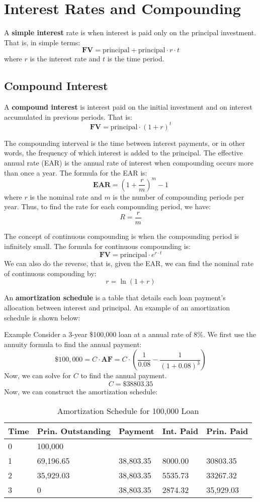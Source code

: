 \section{Interest Rates and Compounding}
A \textbf{simple interest} rate is when interest is paid only on the principal investment. That is, in simple terms:
$$
\textbf{FV} = \text{principal} + \text{principal} \cdot r \cdot t
$$
where $r$ is the interest rate and $t$ is the time period.

\subsection{Compound Interest}
A \textbf{compound interest} is interest paid on the initial investment and on interest accumulated in previous periods. That is:
$$
\textbf{FV} = \text{principal} \cdot (1 + r)^t
$$

The compounding interveal is the time between interest payments, or in other words, the frequency of which interest is added to the principal. The effective annual rate (EAR) is the annual rate of interest when compounding occurs more than once a year. The formula for the EAR is:
$$
\textbf{EAR} = \left(1 + \frac{r}{m}\right)^m - 1
$$
where $r$ is the nominal rate and $m$ is the number of compounding periods per year. Thus, to find the rate for each compounding period, we have:
$$
R = \frac{r}{m}
$$

The concept of continuous compounding is when the compounding period is infinitely small. The formula for continuous compounding is:
$$
\textbf{FV} = \text{principal} \cdot e^{r \cdot t}
$$
We can also do the reverse, that is, given the EAR, we can find the nominal rate of continuous compouding by:
$$
r = \ln(1 + r)
$$

An \textbf{amortization schedule} is a table that details each loan payment's allocation between interest and principal. An example of an amortization schedule is shown below:
\begin{examplebox}{Example}
	Consider a 3-year \$100,000 loan at a annual rate of 8\%. We first use the annuity formula to find the annual payment:
	$$
	\$100,000 = C\cdot \textbf{AF} = C \cdot (\frac{1}{0.08}-\frac{1}{(1+0.08)^3}) 
	$$
	Now, we can solve for $C$ to find the annual payment. 
	$$
	C = \$38803.35
	$$
	Now, we can construct the amortization schedule:
\begin{table}[H]
	\centering
	\begin{tabular}{lllll}
		\toprule
		\textbf{Time} & \textbf{Prin. Outstanding} & \textbf{Payment} & \textbf{Int. Paid} & \textbf{Prin. Paid} \\
		\midrule
		0 & 100,000 &&&\\
		1 & 69,196.65 & 38,803.35 & 8000.00 & 30803.35\\
		2 & 35,929.03 & 38,803.35 & 5535.73 & 33267.32\\
		3 & 0 & 38,803.35 & 2874.32 & 35,929.03\\
		\bottomrule
	\end{tabular}
	\caption{Amortization Schedule for 100,000 Loan}
\end{table}

\end{examplebox}

